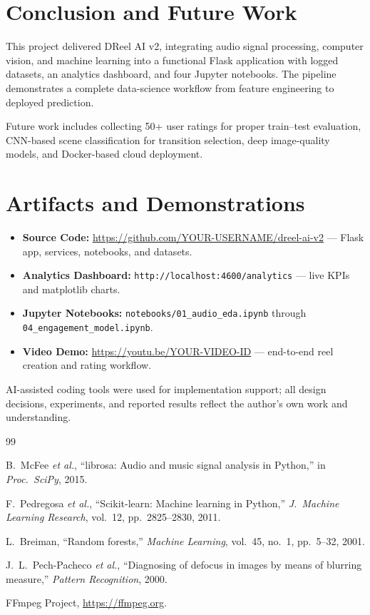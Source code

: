 \documentclass{article}
\begin{document}
\section{Conclusion and Future Work}
\label{sec:conclusion}

This project delivered DReel AI v2, integrating audio signal processing, computer vision, and machine learning into a functional Flask application with logged datasets, an analytics dashboard, and four Jupyter notebooks.
The pipeline demonstrates a complete data-science workflow from feature engineering to deployed prediction.

Future work includes collecting 50+ user ratings for proper train--test evaluation, CNN-based scene classification for transition selection, deep image-quality models, and Docker-based cloud deployment.

\section{Artifacts and Demonstrations}
\label{sec:artifacts}

\begin{itemize}[noitemsep]
    \item \textbf{Source Code:} \url{https://github.com/YOUR-USERNAME/dreel-ai-v2} --- Flask app, services, notebooks, and datasets.
    \item \textbf{Analytics Dashboard:} \texttt{http://localhost:4600/analytics} --- live KPIs and matplotlib charts.
    \item \textbf{Jupyter Notebooks:} \texttt{notebooks/01\_audio\_eda.ipynb} through \texttt{04\_engagement\_model.ipynb}.
    \item \textbf{Video Demo:} \url{https://youtu.be/YOUR-VIDEO-ID} --- end-to-end reel creation and rating workflow.
\end{itemize}

AI-assisted coding tools were used for implementation support; all design decisions, experiments, and reported results reflect the author's own work and understanding.

\vfill\pagebreak
{\fontsize{8}{9}\selectfont

\begin{thebibliography}{99}

B.~McFee \emph{et al.},
``librosa: Audio and music signal analysis in Python,''
in \emph{Proc.\ SciPy}, 2015.

F.~Pedregosa \emph{et al.},
``Scikit-learn: Machine learning in Python,''
\emph{J.\ Machine Learning Research}, vol.~12, pp.~2825--2830, 2011.

L.~Breiman,
``Random forests,''
\emph{Machine Learning}, vol.~45, no.~1, pp.~5--32, 2001.

J.~L.~Pech-Pacheco \emph{et al.},
``Diagnosing of defocus in images by means of blurring measure,''
\emph{Pattern Recognition}, 2000.

FFmpeg Project,
\url{https://ffmpeg.org}.

\end{thebibliography}
}
\end{document}
